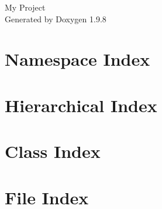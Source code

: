 \documentclass[twoside]{book}
\newcommand{\+}{\discretionary{\mbox{\scriptsize$\hookleftarrow$}}{}{}}
\newcommand{\clearemptydoublepage}{%
    \newpage{\pagestyle{empty}\cleardoublepage}%
  }
\begin{document}
  \raggedbottom
    \hypersetup{pageanchor=false,
                bookmarksnumbered=true,
                pdfencoding=unicode
               }
  \begin{titlepage}
  \vspace*{7cm}
  \begin{center}%
  {\Large My Project}\\
  \vspace*{1cm}
  {\large Generated by Doxygen 1.9.8}\\
  \end{center}
  \end{titlepage}
  \clearemptydoublepage
  \tableofcontents
  \clearemptydoublepage
  \hypersetup{pageanchor=true}
\chapter{Namespace Index}

\chapter{Hierarchical Index}

\chapter{Class Index}

\chapter{File Index}

\end{document}
